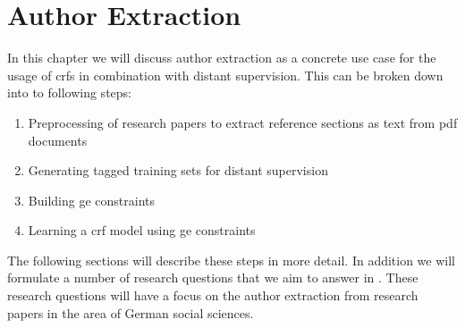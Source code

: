 \chapter{Author Extraction}\label{cha:author-extraction}

\newcommand\researchquestionformat[1]{\begin{quote}#1\end{quote}}

\newcommand\researchquestionone{\researchquestionformat{%
  \RQ{1}: Given a set of unlabeled reference sections from the research area of German social sciences, does using an author list that is related to this area improve the performance of the learned \gls{crf} model in comparison with using an unrelated author list?
}}

\newcommand\researchquestiontwo{\researchquestionformat{%
  \RQ{2}: Given a set of reference sections from the research area of German social sciences with matched author names, does a labeling using the \gls{bieo} improve the performance of the learned \gls{crf} model in comparison with a labeling using the \gls{bio} format?
}}

\newcommand\researchquestionthree{\researchquestionformat{%
  \RQ{3}: Given a set of reference sections from the research area of German social sciences with matched author names, how does, for a word $w_n$ that has no matched author names, modifying the probability mass distribution over the labels in $Val(Y_n)$ impact the performance of a \gls{crf} model that was learned on the resulting \gls{ge} constraints?
}}

\newcommand\researchquestionfour{\researchquestionformat{%
  \RQ{4}: Given a set of reference sections from the research area of German social sciences with matched author names, how does changing the number of considered words $w_n$ which do not have matched author names impact the performance of a \gls{crf} model that was learned on the resulting \gls{ge} constraints?
}}

In this chapter we will discuss author extraction as a concrete use case for the usage of \glspl{crf} in combination with \gls{distant supervision}.
This can be broken down into to following steps:
\begin{enumerate}
  \item Preprocessing of research papers to extract reference sections as text from \gls{pdf} documents
  \item Generating tagged training sets for distant supervision
  \item Building \acrfull{ge} constraints
  \item Learning a \gls{crf} model using \gls{ge} constraints
\end{enumerate}
The following sections will describe these steps in more detail.
In addition we will formulate a number of research questions that we aim to answer in .
These research questions will have a focus on the author extraction from research papers in the area of German social sciences.

